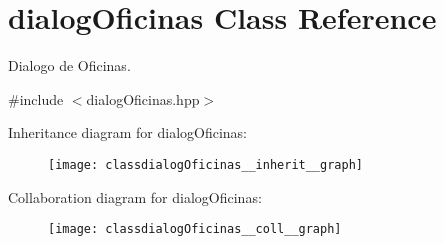 \hypertarget{classdialogOficinas}{}\section{dialog\+Oficinas Class Reference}
\label{classdialogOficinas}


Dialogo de Oficinas.  




{\ttfamily \#include $<$dialog\+Oficinas.\+hpp$>$}



Inheritance diagram for dialog\+Oficinas\+:
\nopagebreak
\begin{figure}[H]
\begin{center}
\leavevmode
\texttt{[image: classdialogOficinas\_\_inherit\_\_graph]}
\end{center}
\end{figure}


Collaboration diagram for dialog\+Oficinas\+:
\nopagebreak
\begin{figure}[H]
\begin{center}
\leavevmode
\texttt{[image: classdialogOficinas\_\_coll\_\_graph]}
\end{center}
\end{figure}
